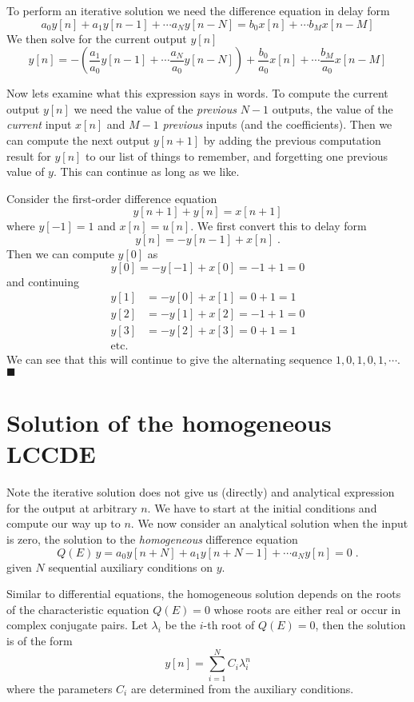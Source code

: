 To perform an iterative solution we need the difference equation in delay form
\[
a_0y[n] + a_1y[n-1] + \cdots a_N y[n-N] = b_0 x[n] + \cdots b_Mx[n-M]
\]
We then solve for the current output $y[n]$
\[
y[n] =  - \left(\frac{a_1}{a_0}y[n-1] + \cdots \frac{a_N}{a_0} y[n-N]\right) + \frac{b_0}{a_0} x[n] + \cdots \frac{b_M}{a_0}x[n-M]
\]

Now lets examine what this expression says in words. To compute the current output $y[n]$ we need the value of the \emph{previous} $N-1$ outputs, the value of the \emph{current} input $x[n]$ and $M-1$ \emph{previous} inputs (and the coefficients). Then we can compute the next output $y[n+1]$ by adding the previous computation result for $y[n]$ to our list of things to remember, and forgetting one previous value of $y$. This can continue as long as we like.

\begin{example}
  Consider the first-order difference equation
  \[
  y[n+1] + y[n] = x[n+1]
  \]
  where $y[-1] = 1$ and $x[n] = u[n]$. We first convert this to delay form
  \[
  y[n] = -y[n-1] + x[n]\; .
  \]
  Then we can compute $y[0]$ as
  \[
  y[0] = -y[-1] + x[0] = -1 + 1 = 0
  \]
  and continuing
  \begin{align*}
  y[1] &= -y[0] + x[1] = 0 + 1 = 1\\
  y[2] &= -y[1] + x[2] = -1 + 1 = 0\\
  y[3] &= -y[2] + x[3] = 0 + 1 = 1\\
  \mbox{etc.}
  \end{align*}
  We can see that this will continue to give the alternating sequence $1,0,1,0,1,\cdots$.
$\blacksquare$
\end{example}

\section{Solution of the homogeneous LCCDE}

Note the iterative solution does not give us (directly) and analytical expression for the output at arbitrary $n$. We have to start at the initial conditions and compute our way up to $n$. We now consider an analytical solution when the input is zero, the solution to the \emph{homogeneous} difference equation
\[
Q(E)\, y = a_0y[n+N] + a_1y[n+N-1] + \cdots a_N y[n] = 0 \; .
\]
given $N$ sequential auxiliary conditions on $y$.

Similar to differential equations, the homogeneous solution depends on the roots of the characteristic equation $Q(E)=0$ whose roots are either real or occur in complex conjugate pairs. Let $\lambda_i$ be the $i$-th root of $Q(E) = 0$, then the solution is of the form
\[
y[n] = \sum\limits_{i=1}^N C_i \lambda_i^{n}
\]
where the parameters $C_i$ are determined from the auxiliary conditions.

